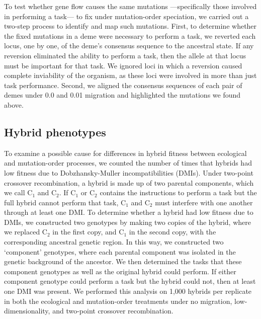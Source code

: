 \begin{doublespace}
To test whether gene flow causes the same mutations%
---specifically those involved in performing a task---%
to fix under mutation-order speciation,
we carried out a two-step process to identify and map such mutations.
%
First, to determine whether the fixed mutations in a deme
were necessary to perform a task,
we reverted each locus, one by one, of the deme's consensus sequence
to the ancestral state.
%
If any reversion eliminated the ability to perform a task,
then the allele at that locus must be important for that task.
%
We ignored loci in which a reversion caused
complete inviability of the organism,
as these loci were involved in more than just task performance.
%
Second, we aligned the consensus sequences of each pair of demes
under 0.0 and 0.01 migration and highlighted the mutations we found above.



\subsection{Hybrid phenotypes}



To examine a possible cause for differences
in hybrid fitness between ecological and mutation-order processes,
we counted the number of times that hybrids had low fitness
due to Dob\-zhan\-sky-Mul\-ler incompatibilities (DMIs).
%
Under two-point crossover recombination,
a hybrid is made up of two parental components,
which we call C$_{1}$ and C$_{2}$.
%
If C$_{1}$ or C$_{2}$ contains the instructions to perform a task
but the full hybrid cannot perform that task,
C$_{1}$ and C$_{2}$ must interfere with one another through at least one DMI.
%
To determine whether a hybrid had low fitness due to DMIs,
we constructed two genotypes by making two copies of the hybrid,
where we replaced C$_{2}$ in the first copy, and C$_{1}$ in the second copy,
with the corresponding ancestral genetic region.
%
In this way, we constructed two `component' genotypes,
where each parental component was isolated
in the genetic background of the ancestor.
%
We then determined the tasks that these component genotypes
as well as the original hybrid could perform.
%
If either component genotype could perform a task
but the hybrid could not, then at least one DMI was present.
%
We performed this analysis on 1,000 hybrids per replicate
in both the ecological and mutation-order treatments
under no migration, low-dimensionality, and two-point crossover recombination.




\end{doublespace}
